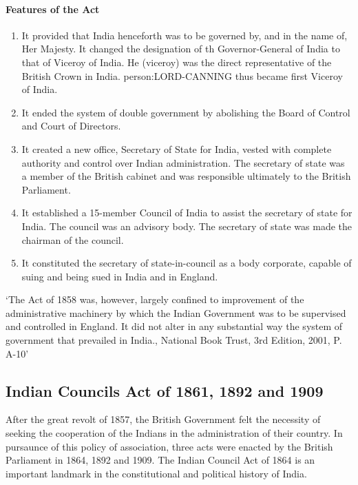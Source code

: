\begin{multicol}{2}
\paragraph{Features of the Act}
\begin{enumerate}
  \item It provided that India henceforth was to be governed by, and in the name of, Her Majesty. It changed the designation of th Governor-General of India to that of Viceroy of India. He (viceroy) was the direct representative of the British Crown in India. \gls{person:LORD-CANNING} thus became first Viceroy of India.
  \item It ended the system of double government by abolishing the Board of Control and Court of Directors.
  \item It created a new office, Secretary of State for India, vested with complete authority and control over Indian administration. The secretary of state was a member of the British cabinet and was responsible ultimately to the British Parliament.
  \item It established a 15-member Council of India to assist the secretary of state for India. The council was an advisory body. The secretary of state was made the chairman of the council.
  \item It constituted the secretary of state-in-council as a body corporate, capable of suing and being sued in India and in England.
\end{enumerate}

`The Act of 1858 was, however, largely confined to improvement of the administrative machinery by which the Indian Government was to be supervised and controlled in England. It did not alter in any substantial way the system of government that prevailed in India., National Book Trust, 3rd Edition, 2001, P. A-10'


\subsection{Indian Councils Act of 1861, 1892 and 1909}

After the great revolt of 1857, the British Government felt the necessity of seeking the cooperation of the Indians in the administration of their country. In pursaunce of this policy of association, three acts were enacted by the British Parliament in 1864, 1892 and 1909. The Indian Council Act of 1864 is an important landmark in the constitutional and political history of India.


\end{multicol}
